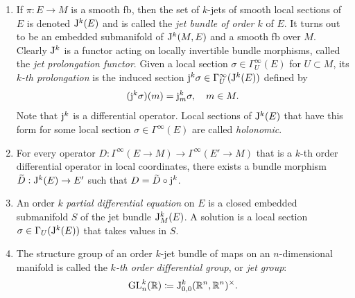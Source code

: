 \begin{defn}
\begin{enumerate}
        On the sets of all $k$-jets $\rmJ^k(M,M')=\bigsqcup_{m\in M}\rmJ^k_m(M,M')$ we can define natural projections
        \begin{align}
            \pi^k_l:\rmJ^k(M,M')\to \rmJ^l(M,M'),&\quad  \rmj_m^l f\mapsto m, 0\leq l<k,\\
            \pi^k_0:\rmJ^k(M,M')\to M\times M',&\quad \rmj_m^k f\mapsto (m,f(m)).
        \end{align}
        The projections $\pi^k_0$ induce a unique smooth structure on $\rmJ^k(M,M')$ that turns both of the projections into smooth \glspl{fb}. The map $\pi^k_0$ is called the \emph{$k$-th jet bundle} of maps from $M$ to $M'$.
        We set
        \[\rmJ^k_{m}(M,M')_{m'}\coloneqq (\pi^k_0)^{-1}((m,m')).\]
        If $\dim M=n$ and $\dim N=n'$, then the typical fiber of the jet bundle is the manifold $\rmJ^k_{0}(\bbR^n,\bbR^{n'})_0$, which parametrizes the values of Taylor coefficients (above the $0$-th order) of maps in a local chart.
        \item If $\pi:E\to M$ is a smooth \gls{fb}, then the set of $k$-jets of smooth local sections of $E$ is denoted $\mathrm{J}^k(E)$ and is called the \emph{jet bundle of order $k$} of $E$. It turns out to be an embedded submanifold of $\mathrm{J}^k(M,E)$ and a smooth \gls{fb} over $M$. Clearly $\mathrm{J}^k$ is a functor acting on locally invertible bundle morphisms, called the \emph{jet prolongation functor}. Given a local section $\sigma\in \Gamma_U^\infty(E)$ for $U\subset M$, its \emph{$k$-th prolongation} is the induced section $\mathrm{j}^k\sigma\in\Gamma_U^\infty(\mathrm{J}^k(E))$ defined by
        \[(\mathrm{j}^k\sigma)(m)=\mathrm{j}^k_m\sigma,\quad m\in M.\]
        Note that $\mathrm{j}^k$ is a differential operator. Local sections of $\mathrm{J}^k(E)$ that have this form for some local section $\sigma\in\Gamma^\infty(E)$ are called \emph{holonomic}.
        \item For every operator $D:\Gamma^\infty(E\to M)\to \Gamma^\infty(E'\to M)$ that is a $k$-th order differential operator in local coordinates, there exists a bundle morphism $\wt D:\rmJ^k(E)\to E'$ such that $D=\wt D\circ \rmj^k$.
        \item An order $k$ \emph{partial differential equation} on $E$ is a closed embedded submanifold $S$ of the jet bundle $\mathrm{J}^k_M(E)$. A solution is a local section $\sigma\in\Gamma_U(\mathrm{J}^k(E))$ that takes values in $S$. 
        \item The structure group of an order $k$-jet bundle of maps on an $n$-dimensional manifold is called the \emph{$k$-th order differential group}, or \emph{jet group}: 
        \[\operatorname{GL}^k_n(\mathbb{R})\coloneqq \mathrm{J}^k_{0,0}(\mathbb{R}^n,\mathbb{R}^n)^\times.\]
    \end{enumerate}
\end{defn}

